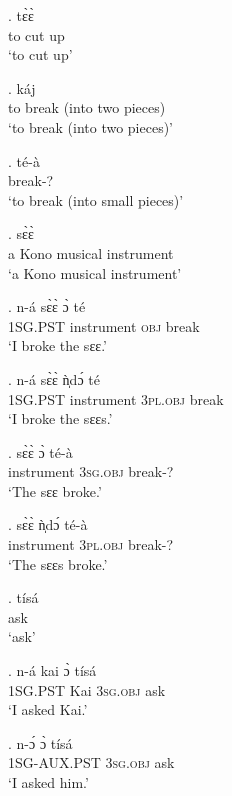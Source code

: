 \documentclass{assets/fieldnotes}
\begin{document}

\exg. tɛ̀ɛ̀\\
to cut up\\
`to cut up’

\exg. káj\\
to break (into two pieces)\\
`to break (into two pieces)’

\exg. té-à\\
break-?\\
`to break (into small pieces)’

\exg. sɛ̀ɛ̀\\
a Kono musical instrument\\
`a Kono musical instrument’

\exg. n-á sɛ̀ɛ̀ ɔ̀ té\\
\textsc{1SG.PST} instrument \textsc{obj} break\\
‘I broke the sɛɛ.’

\exg. n-á sɛ̀ɛ̀ ǹ̩dɔ́ té\\
\textsc{1SG.PST} instrument \textsc{3pl.obj} break\\
‘I broke the sɛɛs.’

\exg. sɛ̀ɛ̀ ɔ̀ té-à\\
instrument \textsc{3sg.obj} break-?\\
‘The sɛɛ broke.’

\exg. sɛ̀ɛ̀ ǹ̩dɔ́ té-à\\
instrument \textsc{3pl.obj} break-?\\
‘The sɛɛs broke.’

\exg. tísá\\
ask\\
`ask’

\exg. n-á kai ɔ̀ tísá\\
\textsc{1SG.PST} Kai \textsc{3sg.obj} ask\\
`I asked Kai.’

\exg. n-ɔ́ ɔ̀ tísá\\
\textsc{1SG-AUX.PST} \textsc{3sg.obj} ask\\
`I asked him.’\\
\end{document}

